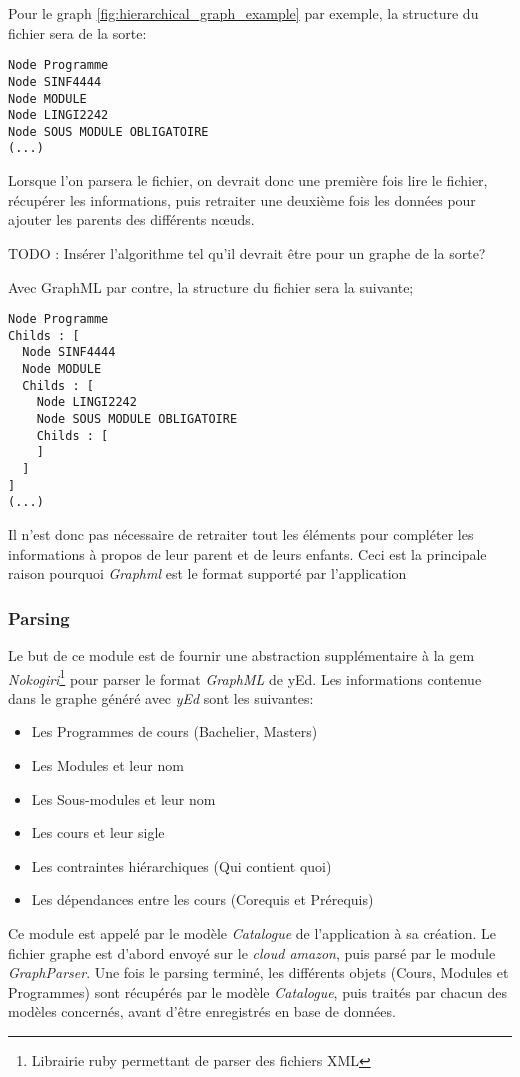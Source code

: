 Pour le graph \ref{fig:hierarchical_graph_example} par exemple, la structure du fichier sera de la sorte:
\begin{lstlisting}
Node Programme
Node SINF4444
Node MODULE
Node LINGI2242
Node SOUS MODULE OBLIGATOIRE
(...)
\end{lstlisting}

Lorsque l'on parsera le fichier, on devrait donc une première fois lire le fichier, récupérer les informations, puis retraiter une deuxième fois les données pour ajouter les parents des différents nœuds.

TODO : Insérer l'algorithme tel qu'il devrait être pour un graphe de la sorte?

Avec GraphML par contre, la structure  du fichier sera la suivante;

\begin{lstlisting}
Node Programme
Childs : [
  Node SINF4444
  Node MODULE
  Childs : [
    Node LINGI2242
    Node SOUS MODULE OBLIGATOIRE
    Childs : [
    ]
  ]
]
(...)
\end{lstlisting}

Il n'est donc pas nécessaire de retraiter tout les éléments pour compléter les informations à propos de leur parent et de leurs enfants. Ceci est la principale raison pourquoi \textit{Graphml} est le format supporté par l'application


\subsubsection{Parsing}
\label{graph_parsing}
Le but de ce module est de fournir une abstraction supplémentaire à la gem \textit{Nokogiri}\footnote{Librairie ruby permettant de parser des fichiers XML} pour parser le format \textit{GraphML} de yEd. Les informations contenue dans le graphe généré avec \textit{yEd} sont les suivantes:
\begin{itemize}
\item Les Programmes de cours (Bachelier, Masters)
\item Les Modules et leur nom
\item Les Sous-modules et leur nom
\item Les cours et leur sigle
\item Les contraintes hiérarchiques (Qui contient quoi)
\item Les dépendances entre les cours (Corequis et Prérequis)
\end{itemize}

Ce module est appelé par le modèle \textit{Catalogue} de l'application à sa création. Le fichier graphe est d'abord envoyé sur le  \textit{cloud amazon}, puis parsé par le module \textit{GraphParser}. Une fois le parsing terminé, les différents objets (Cours, Modules et Programmes) sont récupérés par le modèle \textit{Catalogue}, puis traités par chacun des modèles concernés, avant d'être enregistrés en base de données. 

